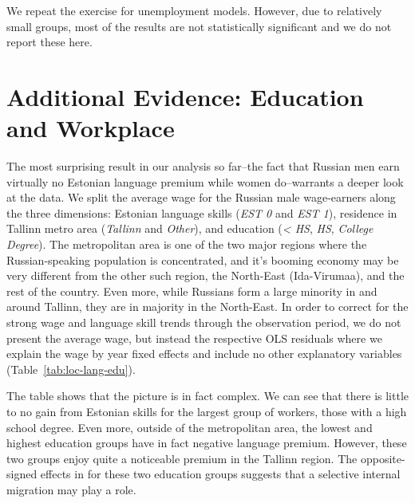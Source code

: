 \documentclass[12pt, a4paper]{article}
\begin{document}
We repeat the exercise for unemployment models.
However, due to relatively small groups, most of the results are not
statistically significant and we
do not report these here.



\section{Additional Evidence: Education and Workplace}
\label{sec:segregation_analysis}

The most surprising result in our analysis so far--the fact that
Russian men earn virtually no Estonian language premium while women do--warrants a
deeper look at the data.  We split the average wage for the Russian male wage-earners
along the three
dimensions: Estonian language skills (\emph{EST 0} and \emph{EST 1}),
residence in Tallinn metro area (\emph{Tallinn} and \emph{Other}),
and education (\emph{< HS}, \emph{HS}, \emph{College Degree}).  The metropolitan area is one of the two major regions
where the Russian-speaking population is concentrated, and it's
booming economy may be very different from the other such region, the
North-East (Ida-Virumaa), and the rest of the country.
Even more, while Russians form a large minority in and around Tallinn,
they are in majority in the North-East.  
In order to correct for the strong wage and language skill trends
through the observation period, we do not present the average wage,
but instead the respective OLS residuals where we explain the wage by year fixed
effects and include no other explanatory variables (Table~\ref{tab:loc-lang-edu}). 

The table shows that the picture is in fact complex.  We can see
that there is little to no gain from Estonian skills for the
largest group of workers, those with a high school degree.  Even more, outside of
the metropolitan area, the lowest and highest education groups
have in fact negative language premium.  However, these two groups
enjoy quite a noticeable premium in the Tallinn region.  The
opposite-signed effects in for these two education groups suggests
that a
selective internal migration may play a role.
\end{document}
